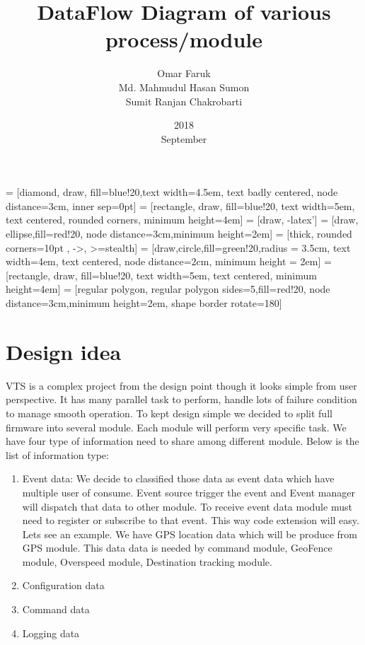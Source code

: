 \documentclass[10pt,legal]{article}
\title{DataFlow Diagram of various process/module}
\date {2018 \\ September}
\author{Omar Faruk \\ Md. Mahmudul Hasan Sumon \\ Sumit Ranjan Chakrobarti}
\begin{document}
\maketitle
\newpage
\tableofcontents
\newpage
{}
 = [diamond, draw, fill=blue!20,text width=4.5em, text badly centered, node distance=3cm, inner sep=0pt]
 = [rectangle, draw, fill=blue!20, text width=5em, text centered, rounded corners, minimum height=4em]
 = [draw, -latex']
 = [draw, ellipse,fill=red!20, node distance=3cm,minimum height=2em]
 = [thick, rounded corners=10pt , ->, >=stealth]
 = [draw,circle,fill=green!20,radius = 3.5cm, text width=4em, text centered, node distance=2cm, minimum height = 2em]
 = [rectangle, draw, fill=blue!20, text width=5em, text centered, minimum height=4em]
\tikzset{>=latex}
 = [regular polygon, regular polygon sides=5,fill=red!20, node distance=3cm,minimum height=2em, shape border rotate=180]

\newpage



\section{Design idea}
VTS is a complex project from the design point though it looks simple from user perspective. It has many parallel task to perform, handle lots of failure condition to manage smooth operation. To kept design simple we decided to split full firmware into several module. Each module will perform very specific task. We have four type of information need to share among different module. Below is the list of information type:
\begin{enumerate}
	\item Event data: We decide to classified those data as event data which have multiple user of consume. Event source trigger the event and Event manager will dispatch that data to other module. To receive event data module must need to register or subscribe to that event. This way code extension will easy. Lets see an example. We have GPS location data which will be produce from GPS module. This data data is needed by command module, GeoFence module, Overspeed module, Destination tracking module. 
	\item Configuration data
	\item Command data
	\item Logging data
\end{enumerate}
\end{document}
